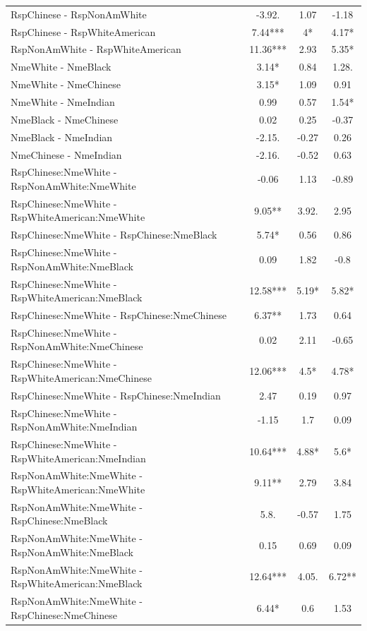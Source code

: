 \documentclass[]{report}
\begin{document}
\begin{table}
{\begin{tabular}[t]{lccc}
		\bottomrule
		RspChinese - RspNonAmWhite & -3.92. & 1.07 & -1.18 \\ 
		RspChinese - RspWhiteAmerican & 7.44*** & 4* & 4.17* \\ 
		RspNonAmWhite - RspWhiteAmerican & 11.36*** & 2.93 & 5.35* \\ 
		NmeWhite - NmeBlack & 3.14* & 0.84 & 1.28. \\ 
		NmeWhite - NmeChinese & 3.15* & 1.09 & 0.91 \\ 
		NmeWhite - NmeIndian & 0.99 & 0.57 & 1.54* \\ 
		NmeBlack - NmeChinese & 0.02 & 0.25 & -0.37 \\ 
		NmeBlack - NmeIndian & -2.15. & -0.27 & 0.26 \\ 
		NmeChinese - NmeIndian & -2.16. & -0.52 & 0.63 \\ 
		RspChinese:NmeWhite - RspNonAmWhite:NmeWhite & -0.06 & 1.13 & -0.89 \\ 
		RspChinese:NmeWhite - RspWhiteAmerican:NmeWhite & 9.05** & 3.92. & 2.95 \\ 
		RspChinese:NmeWhite - RspChinese:NmeBlack & 5.74* & 0.56 & 0.86 \\ 
		RspChinese:NmeWhite - RspNonAmWhite:NmeBlack & 0.09 & 1.82 & -0.8 \\ 
		RspChinese:NmeWhite - RspWhiteAmerican:NmeBlack & 12.58*** & 5.19* & 5.82* \\ 
		RspChinese:NmeWhite - RspChinese:NmeChinese & 6.37** & 1.73 & 0.64 \\ 
		RspChinese:NmeWhite - RspNonAmWhite:NmeChinese & 0.02 & 2.11 & -0.65 \\ 
		RspChinese:NmeWhite - RspWhiteAmerican:NmeChinese & 12.06*** & 4.5* & 4.78* \\ 
		RspChinese:NmeWhite - RspChinese:NmeIndian & 2.47 & 0.19 & 0.97 \\ 
		RspChinese:NmeWhite - RspNonAmWhite:NmeIndian & -1.15 & 1.7 & 0.09 \\ 
		RspChinese:NmeWhite - RspWhiteAmerican:NmeIndian & 10.64*** & 4.88* & 5.6* \\ 
		RspNonAmWhite:NmeWhite - RspWhiteAmerican:NmeWhite & 9.11** & 2.79 & 3.84 \\ 
		RspNonAmWhite:NmeWhite - RspChinese:NmeBlack & 5.8. & -0.57 & 1.75 \\ 
		RspNonAmWhite:NmeWhite - RspNonAmWhite:NmeBlack & 0.15 & 0.69 & 0.09 \\ 
		RspNonAmWhite:NmeWhite - RspWhiteAmerican:NmeBlack & 12.64*** & 4.05. & 6.72** \\ 
		RspNonAmWhite:NmeWhite - RspChinese:NmeChinese & 6.44* & 0.6 & 1.53 \\ 

\end{tabular}}
\end{table}
\end{document}
